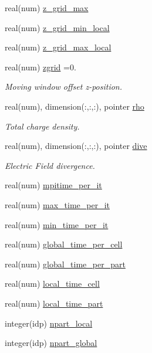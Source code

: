 \begin{DoxyCompactItemize}
real(num) \hyperlink{namespaceshared__data_a620f1c71c4db6b0f2b9f0acc6aefa10d}{z\+\_\+grid\+\_\+max}
\item 
real(num) \hyperlink{namespaceshared__data_a09f7e7f94540648ce5317cf34331f893}{z\+\_\+grid\+\_\+min\+\_\+local}
\item 
real(num) \hyperlink{namespaceshared__data_a456c52690b2fd4549464d70435bb3181}{z\+\_\+grid\+\_\+max\+\_\+local}
\item 
real(num) \hyperlink{namespaceshared__data_aa22a8c4655934eea9cdf5b3c33ca9a33}{zgrid} =0.
\begin{DoxyCompactList}\small\item\em Moving window offset z-\/position. \end{DoxyCompactList}\item 
real(num), dimension(\+:,\+:,\+:), pointer \hyperlink{namespaceshared__data_a9cd7a07e41ca84210bf52e8480ac5d62}{rho}
\begin{DoxyCompactList}\small\item\em Total charge density. \end{DoxyCompactList}\item 
real(num), dimension(\+:,\+:,\+:), pointer \hyperlink{namespaceshared__data_a548e3c8fc335921c106eada05587df31}{dive}
\begin{DoxyCompactList}\small\item\em Electric Field divergence. \end{DoxyCompactList}\item 
real(num) \hyperlink{namespaceshared__data_a0a831038bb26f462cfcbb55ed577eca7}{mpitime\+\_\+per\+\_\+it}
\item 
real(num) \hyperlink{namespaceshared__data_ab3fad0c11b277d8e2932f2bb561174c0}{max\+\_\+time\+\_\+per\+\_\+it}
\item 
real(num) \hyperlink{namespaceshared__data_a432338eee67029c7662a11e912c8d46d}{min\+\_\+time\+\_\+per\+\_\+it}
\item 
real(num) \hyperlink{namespaceshared__data_ab51a77acb74b422253df3dd1b679f6dd}{global\+\_\+time\+\_\+per\+\_\+cell}
\item 
real(num) \hyperlink{namespaceshared__data_a689bcd908f5e464afc037e6f78dd6d49}{global\+\_\+time\+\_\+per\+\_\+part}
\item 
real(num) \hyperlink{namespaceshared__data_a66b7cc87acc2d0570007065692788888}{local\+\_\+time\+\_\+cell}
\item 
real(num) \hyperlink{namespaceshared__data_ab078d1e05e9fcee7f81e723b0074f5f9}{local\+\_\+time\+\_\+part}
\item 
integer(idp) \hyperlink{namespaceshared__data_a4d52b152090f02e4e16a9fe24e0e1ec3}{npart\+\_\+local}
\item 
integer(idp) \hyperlink{namespaceshared__data_a630ce8e0e1ba68428eacff437d15f6cc}{npart\+\_\+global}
\end{DoxyCompactItemize}


